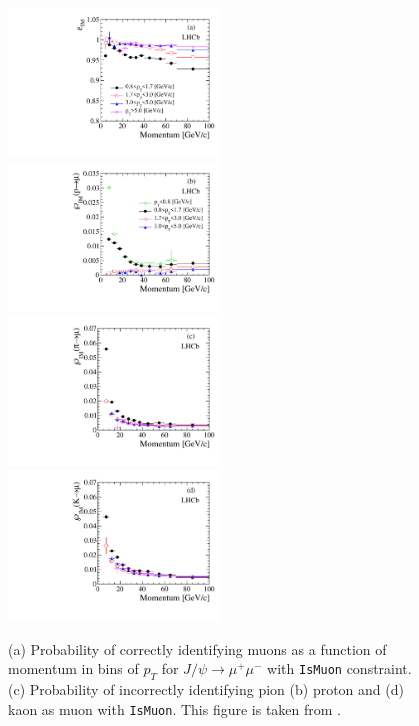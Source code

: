 \begin{figure}[!h]
	\includegraphics[width = 0.5\textwidth]{figs/detector/dllFit_mu_IMvsPvsPt.pdf}%
	\includegraphics[width = 0.5\textwidth]{figs/detector/dllFit_P_IMvsPvsPt.pdf}%
       \newline
	\includegraphics[width = 0.5\textwidth]{figs/detector/dllFit_pi_IMvsPvsPt.pdf}%
	\includegraphics[width = 0.5\textwidth]{figs/detector/dllFit_ka_IMvsPvsPt.pdf}%
	\caption{(a) Probability of correctly identifying muons as a function of momentum \DIFdelbeginFL {}\DIFdelendFL in \DIFdelbeginFL {}\DIFdelendFL bins of $p_{T}$ for $J/\psi \rightarrow \mu^{+} \mu^{-}$ with \DIFaddbeginFL {}\DIFaddendFL \texttt{IsMuon} constraint. (c) Probability of incorrectly identifying \DIFaddbeginFL {}\DIFaddendFL pion (b) proton and (d) kaon as \DIFaddbeginFL {}\DIFaddendFL muon with \texttt{IsMuon}. This figure is taken from \cite{LHCb-DP-2013-001}. }  
	\label{fig:MuonID}
\end{figure}


